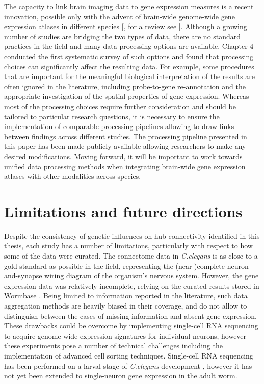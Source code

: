 The capacity to link brain imaging data to gene expression measures is a recent innovation, possible only with the advent of brain-wide genome-wide gene expression atlases in different species [\citep{Harris2010,Hawrylycz2012,Lein2007a}, for a review see \citep{Keil2018}]. Although a growing number of studies are bridging the two types of data, there are no standard practices in the field and many data processing options are available. Chapter 4 conducted the first systematic survey of such options and found that processing choices can significantly affect the resulting data. For example, some procedures that are important for the meaningful biological interpretation of the results are often ignored in the literature, including  probe-to-gene re-annotation and the appropriate investigation of the spatial properties of gene expression. Whereas most of the processing choices require further consideration and should be tailored to particular research questions, it is necessary to ensure the implementation of comparable processing pipelines allowing to draw links between findings across different studies. The processing pipeline presented in this paper has been made publicly available allowing researchers to make any desired modifications. Moving forward, it will be important to work towards unified data processing methods when integrating brain-wide gene expression atlases with other modalities across species.

\section{Limitations and future directions}

Despite the consistency of genetic influences on hub connectivity identified in this thesis, each study has a number of limitations, particularly with respect to how some of the data were curated. The connectome data in \textit{C.elegans} is as close to a gold standard as possible in the field, representing the (near-)complete neuron-and-synapse wiring diagram of the organism's nervous system. However, the gene expression data was relatively incomplete, relying on the curated results stored in Wormbase \citep{Harris2010}. Being limited to  information reported in the literature, such data aggregation methods are heavily biased in their coverage, and do not allow to distinguish between the cases of missing information and absent gene expression. These drawbacks could be overcome by implementing single-cell RNA sequencing to acquire genome-wide expression signatures for individual neurons, however these experiments pose a number of technical challenges including the implementation of advanced cell sorting techniques. Single-cell RNA sequencing has been performed on a larval stage of \textit{C.elegans} development \citep{Cao2017}, however it has not yet been extended to single-neuron gene expression in the adult worm.

